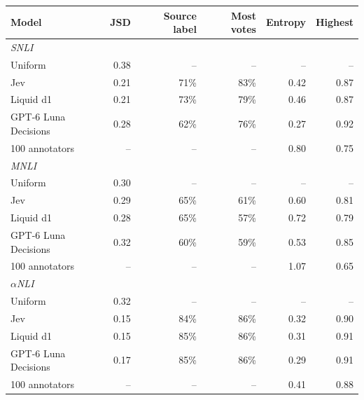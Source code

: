 \begin{tabular}{lrrrrr}
\toprule
Model & JSD & Source label & Most votes & Entropy & Highest \\
\midrule
\multicolumn{6}{l}{\emph{SNLI}} \\
Uniform & 0.38 & -- & -- & -- & -- \\
Jev & 0.21 & 71\% & 83\% & 0.42 & 0.87 \\
Liquid d1 & 0.21 & 73\% & 79\% & 0.46 & 0.87 \\
GPT-6 Luna Decisions & 0.28 & 62\% & 76\% & 0.27 & 0.92 \\
100 annotators & -- & -- & -- & 0.80 & 0.75 \\
\midrule
\multicolumn{6}{l}{\emph{MNLI}} \\
Uniform & 0.30 & -- & -- & -- & -- \\
Jev & 0.29 & 65\% & 61\% & 0.60 & 0.81 \\
Liquid d1 & 0.28 & 65\% & 57\% & 0.72 & 0.79 \\
GPT-6 Luna Decisions & 0.32 & 60\% & 59\% & 0.53 & 0.85 \\
100 annotators & -- & -- & -- & 1.07 & 0.65 \\
\midrule
\multicolumn{6}{l}{\emph{$\alpha$NLI}} \\
Uniform & 0.32 & -- & -- & -- & -- \\
Jev & 0.15 & 84\% & 86\% & 0.32 & 0.90 \\
Liquid d1 & 0.15 & 85\% & 86\% & 0.31 & 0.91 \\
GPT-6 Luna Decisions & 0.17 & 85\% & 86\% & 0.29 & 0.91 \\
100 annotators & -- & -- & -- & 0.41 & 0.88 \\
\bottomrule
\end{tabular}
